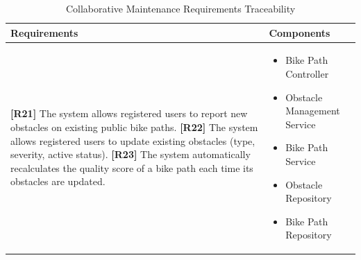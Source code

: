 \begin{table}[H]
\centering
\begin{tabular}{|p{}|p{}|}
\hline
\textbf{Requirements} & \textbf{Components} \\
\hline

\textbf{[R21]} The system allows registered users to report new obstacles on existing public bike paths. \newline
\textbf{[R22]} The system allows registered users to update existing obstacles (type, severity, active status). \newline
\textbf{[R23]} The system automatically recalculates the quality score of a bike path each time its obstacles are updated.

&

\begin{itemize}
    \item Bike Path Controller
    \item Obstacle Management Service
    \item Bike Path Service
    \item Obstacle Repository
    \item Bike Path Repository
\end{itemize} \\
\hline

\end{tabular}
\caption{Collaborative Maintenance Requirements Traceability}
\label{tab:maintenance-requirements}
\end{table}


